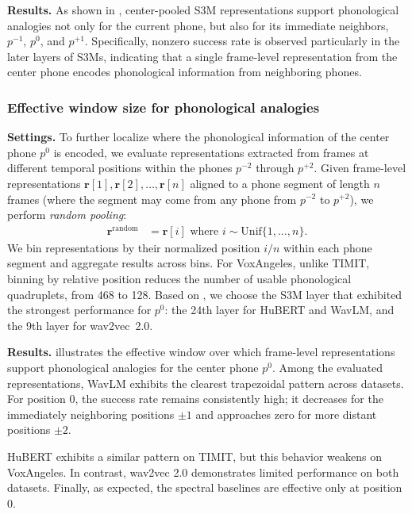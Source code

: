 \documentclass[cameraready]{Interspeech}
\begin{document}
\textbf{Results.}
As shown in , center-pooled S3M representations support phonological analogies not only for the current phone, but also for its immediate neighbors, $p^{-1}$, $p^{0}$, and $p^{+1}$.
Specifically, nonzero success rate is observed particularly in the later layers of S3Ms, indicating that a single frame-level representation from the center phone encodes phonological information from neighboring phones.


\subsubsection{Effective window size for phonological analogies}\label{ss:neighbors-random}
\textbf{Settings.}
To further localize where the phonological information of the center phone $p^{0}$ is encoded, we evaluate representations extracted from frames at different temporal positions within the phones $p^{-2}$ through $p^{+2}$.
Given frame-level representations $\mathbf{r}[1], \mathbf{r}[2], \ldots, \mathbf{r}[n]$ aligned to a phone segment of length $n$ frames (where the segment may come from any phone from $p^{-2}$ to $p^{+2}$), we perform \emph{random pooling}:
\begin{align}
    \mathbf{r}^\text{random} &= \mathbf{r}[i]\text{ where } i \sim \text{Unif}\{1, \dots, n\}.
\end{align}
We bin representations by their normalized position $i/n$ within each phone segment and aggregate results across bins.
For VoxAngeles, unlike TIMIT, binning by relative position reduces the number of usable phonological quadruplets, from 468 to 128.
Based on , we choose the S3M layer that exhibited the strongest performance for $p^{0}$: the 24th layer for HuBERT and WavLM, and the 9th layer for wav2vec~2.0.


\textbf{Results.}
 illustrates the effective window over which frame-level representations support phonological analogies for the center phone $p^{0}$.
Among the evaluated representations, WavLM exhibits the clearest trapezoidal pattern across datasets.
For position $0$, the success rate remains consistently high; it decreases for the immediately neighboring positions $\pm 1$ and approaches zero for more distant positions $\pm 2$.


HuBERT exhibits a similar pattern on TIMIT, but this behavior weakens on VoxAngeles.
In contrast, wav2vec 2.0 demonstrates limited performance on both datasets.
Finally, as expected, the spectral baselines are effective only at position 0.
\end{document}
